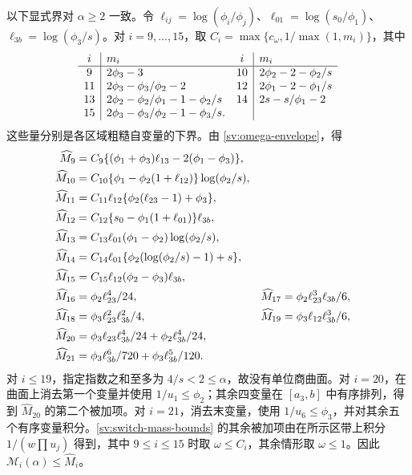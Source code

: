 以下显式界对 $\alpha\ge2$ 一致。令 $\ell_{ij}=\log(\phi_i/\phi_j)$、$\ell_{01}=\log(s_0/\phi_1)$、$\ell_{3b}=\log(\phi_3/s)$。对 $i=9,\ldots,15$，取 $C_i=\max\{c_\omega,1/\max(1,m_i)\}$，其中
\[
\begin{array}{c|l@{\quad}c|l}
i&m_i&i&m_i\\ \hline
9&2\phi_3-3&10&2\phi_2-2-\phi_2/s\\
11&2\phi_3-\phi_3/\phi_2-2
 &12&2\phi_1-2-\phi_1/s\\
13&2\phi_2-\phi_2/\phi_1-1-\phi_2/s
 &14&2s-s/\phi_1-2\\
15&2\phi_3-\phi_3/\phi_2-1-\phi_3/s.&&
\end{array}
\]
这些量分别是各区域粗糙自变量的下界。由 \eqref{sv:omega-envelope}，得
\begin{align}\label{sv:switch-mass-bounds}
 \widehat M_9&=C_9\{(\phi_1+\phi_3)\ell_{13}-2(\phi_1-\phi_3)\},\notag\\
 \widehat M_{10}&=C_{10}\{\phi_1-\phi_2(1+\ell_{12})\}
                                          \log(\phi_2/s),\notag\\
 \widehat M_{11}&=C_{11}\ell_{12}\{\phi_2(\ell_{23}-1)+\phi_3\},\notag\\
 \widehat M_{12}&=C_{12}\{s_0-\phi_1(1+\ell_{01})\}\ell_{3b},\notag\\
 \widehat M_{13}&=C_{13}\ell_{01}(\phi_1-\phi_2)\log(\phi_2/s),\notag\\
 \widehat M_{14}&=C_{14}\ell_{01}
                       \{\phi_2(\log(\phi_2/s)-1)+s\},\notag\\
 \widehat M_{15}&=C_{15}\ell_{12}(\phi_2-\phi_3)\ell_{3b},\notag\\
 \widehat M_{16}&=\phi_2\ell_{23}^4/24,
 &\widehat M_{17}&=\phi_2\ell_{23}^3\ell_{3b}/6,\notag\\
 \widehat M_{18}&=\phi_3\ell_{23}^2\ell_{3b}^2/4,
 &\widehat M_{19}&=\phi_3\ell_{12}\ell_{3b}^3/6,\notag\\
 \widehat M_{20}&=\phi_3\ell_{23}\ell_{3b}^4/24
                         +\phi_2\ell_{3b}^4/24,\notag\\
 \widehat M_{21}&=\phi_3\ell_{3b}^6/720+\phi_3\ell_{3b}^5/120.
 \end{align}
对 $i\le19$，指定指数之和至多为 $4/s<2\le\alpha$，故没有单位商曲面。对 $i=20$，在曲面上消去第一个变量并使用 $1/u_1\le\phi_2$；其余四变量在 $[a_3,b]$ 中有序排列，得到 $\widehat M_{20}$ 的第二个被加项。对 $i=21$，消去末变量，使用 $1/u_6\le\phi_3$，并对其余五个有序变量积分。\eqref{sv:switch-mass-bounds} 的其余被加项由在所示区带上积分 $1/(w\prod u_j)$ 得到，其中 $9\le i\le15$ 时取 $\omega\le C_i$，其余情形取 $\omega\le1$。因此 $\mathcal M_i(\alpha)\le\widehat M_i$。

